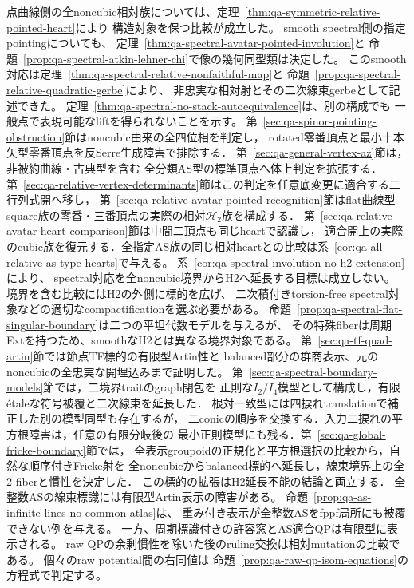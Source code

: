 \documentclass[a4paper,11pt]{ltjsarticle}
\numberwithin{equation}{section}
\theoremstyle{plain}
\theoremstyle{definition}
\theoremstyle{remark}
\newcommand{\HH}{\mathcal H_2}
\begin{document}
点曲線側の全noncubic相対族については、定理~\ref{thm:qa-symmetric-relative-pointed-heart}により
構造対象を保つ比較が成立した。
smooth spectral側の指定pointingについても、
定理~\ref{thm:qa-spectral-avatar-pointed-involution}と
命題~\ref{prop:qa-spectral-atkin-lehner-chi}で像の幾何同型類は決定した。
このsmooth対応は定理~\ref{thm:qa-spectral-relative-nonfaithful-map}と
命題~\ref{prop:qa-spectral-relative-quadratic-gerbe}により、
非忠実な相対射とその二次線束gerbeとして記述できた。
定理~\ref{thm:qa-spectral-no-stack-autoequivalence}は、別の構成でも
一般点で表現可能なliftを得られないことを示す。
第~\ref{sec:qa-spinor-pointing-obstruction}節はnoncubic由来の全四位相を判定し，
rotated零番頂点と最小十本矢型零番頂点を反Serre生成障害で排除する．
第~\ref{sec:qa-general-vertex-az}節は，非被約曲線・古典型を含む
全分類AS型の標準頂点へ体上判定を拡張する．
第~\ref{sec:qa-relative-vertex-determinants}節はこの判定を任意底変更に適合する二行列式開へ移し，
第~\ref{sec:qa-relative-avatar-pointed-recognition}節はflat曲線型square族の零番・三番頂点の実際の相対$\HH$族を構成する．
第~\ref{sec:qa-relative-avatar-heart-comparison}節は中間二頂点も同じheartで認識し，
適合開上の実際のcubic族を復元する．全指定AS族の同じ相対heartとの比較は系~\ref{cor:qa-all-relative-as-type-hearts}で与える。
系~\ref{cor:qa-spectral-involution-no-h2-extension}により、
spectral対応を全noncubic境界からH2へ延長する目標は成立しない。
境界を含む比較にはH2の外側に標的を広げ、
二次積付きtorsion-free spectral対象などの適切なcompactificationを選ぶ必要がある。
命題~\ref{prop:qa-spectral-flat-singular-boundary}は二つの平坦代数モデルを与えるが、
その特殊fiberは周期Extを持つため、smoothなH2とは異なる境界対象である。
第~\ref{sec:qa-tf-quad-artin}節では節点TF標的の有限型Artin性と
balanced部分の群商表示、元のnoncubicの全忠実な開埋込みまで証明した。
第~\ref{sec:qa-spectral-boundary-models}節では，二境界traitのgraph閉包を
正則な$I_2/I_4$模型として構成し，有限\'etaleな符号被覆と二次線束を延長した．
根対一致型には四捩れtranslationで補正した別の模型同型も存在するが，
二conicの順序を交換する．入力二捩れの平方根障害は，任意の有限分岐後の
最小正則模型にも残る．第~\ref{sec:qa-global-fricke-boundary}節では，
全表示groupoidの正規化と平方根選択の比較から，自然な順序付きFricke射を
全noncubicからbalanced標的へ延長し，線束境界上の全2-fiberと慣性を決定した．
この標的の拡張はH2延長不能の結論と両立する．
全整数ASの線束標識には有限型Artin表示の障害がある。
命題~\ref{prop:qa-as-infinite-lines-no-common-atlas}は、
重み付き表示が全整数ASをfppf局所にも被覆できない例を与える。
一方、周期標識付きの許容窓とAS適合QPは有限型に表示される。
raw QPの余剰慣性を除いた後のruling交換は相対mutationの比較である。
個々のraw potential間の右同値は
命題~\ref{prop:qa-raw-qp-isom-equations}の方程式で判定する。



\end{document}
